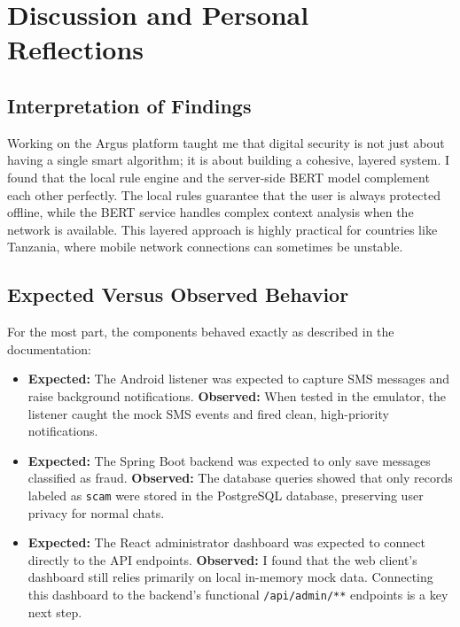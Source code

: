 \chapter{Discussion and Personal Reflections}
\label{ch:discussion}

\section{Interpretation of Findings}
Working on the Argus platform taught me that digital security is not just about having a single smart algorithm; it is about building a cohesive, layered system. I found that the local rule engine and the server-side BERT model complement each other perfectly. The local rules guarantee that the user is always protected offline, while the BERT service handles complex context analysis when the network is available. This layered approach is highly practical for countries like Tanzania, where mobile network connections can sometimes be unstable.

\section{Expected Versus Observed Behavior}
For the most part, the components behaved exactly as described in the documentation:
\begin{itemize}
  \item \textbf{Expected:} The Android listener was expected to capture SMS messages and raise background notifications.
  \textbf{Observed:} When tested in the emulator, the listener caught the mock SMS events and fired clean, high-priority notifications.
  \item \textbf{Expected:} The Spring Boot backend was expected to only save messages classified as fraud.
  \textbf{Observed:} The database queries showed that only records labeled as \texttt{scam} were stored in the PostgreSQL database, preserving user privacy for normal chats.
  \item \textbf{Expected:} The React administrator dashboard was expected to connect directly to the API endpoints.
  \textbf{Observed:} I found that the web client's dashboard still relies primarily on local in-memory mock data. Connecting this dashboard to the backend's functional \texttt{/api/admin/**} endpoints is a key next step.
\end{itemize}

